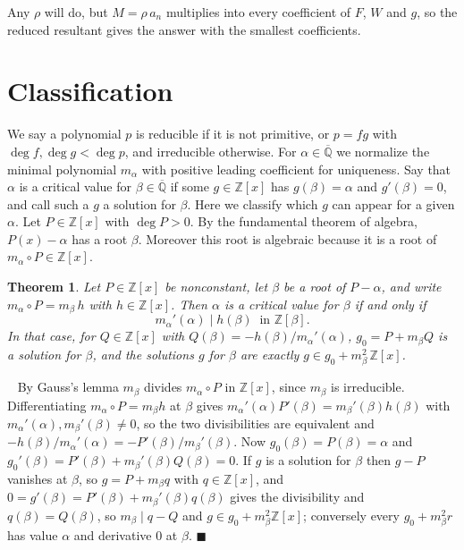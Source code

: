 \documentclass[10pt]{article}
\newcommand\Z{\mathbb{Z}}
\newcommand\Q{\mathbb{Q}}
\newcommand\1{\mathbb{1}}
\theoremstyle{plain}
\newtheorem{theorem}{Theorem}
\theoremstyle{remark}
\theoremstyle{plain}
\newenvironment{pf}{%
  \par\addvspace{\medskipamount}\noindent\uwave{pf.}\ \ignorespaces}{%
  \unskip\nobreak\hfill$\blacksquare$\par\addvspace{\medskipamount}}
\begin{document}
Any $\rho$ will do, but $M = \rho\,a_{n}$ multiplies into every coefficient of
$F$, $W$ and $g$, so the reduced resultant gives the answer with the smallest
coefficients.

\section{Classification}\label{Sclass}

We say a polynomial $p$ is reducible if it is not primitive, or $p = fg$
with $\deg f, \deg g < \deg p$, and irreducible otherwise. For
$\alpha \in \overline{\Q}$ we normalize the minimal polynomial $m_{\alpha}$
with positive leading coefficient for uniqueness.
Say that $\alpha$ is a critical value for $\beta \in \overline{\Q}$ if some
$g \in \Z[x]$ has $g(\beta) = \alpha$ and $g'(\beta) = 0$, and call such a $g$
a solution for $\beta$. Here we classify which $g$ can appear for a given
$\alpha$. Let $P \in \Z[x]$ with $\deg P > 0$. By the fundamental theorem
of algebra, $P(x) - \alpha$ has a root $\beta$. Moreover this root is
algebraic because it is a root of $m_{\alpha} \circ P \in \Z[x]$.

\begin{theorem}\label{Tcoset}
  Let $P \in \Z[x]$ be nonconstant, let $\beta$ be a root of $P - \alpha$,
  and write $m_{\alpha} \circ P = m_{\beta}\,h$ with $h \in \Z[x]$. Then
  $\alpha$ is a critical value for $\beta$ if and only if
  \[
    m_{\alpha}'(\alpha) \mid h(\beta) \ \text{ in } \Z[\beta] .
  \]
  In that case,
  for $Q \in \Z[x]$ with $Q(\beta) = -h(\beta)/m_{\alpha}'(\alpha)$,
  $g_{0} = P + m_{\beta}Q$ is a solution for $\beta$, and the solutions $g$
  for $\beta$ are exactly $g \in g_{0} + m_{\beta}^{2}\,\Z[x]$.
\end{theorem}

\begin{pf}
  By Gauss's lemma $m_{\beta}$ divides $m_{\alpha} \circ P$ in $\Z[x]$, since
  $m_{\beta}$ is irreducible. Differentiating $m_{\alpha} \circ P = m_{\beta}h$
  at $\beta$ gives $m_{\alpha}'(\alpha)P'(\beta) = m_{\beta}'(\beta)h(\beta)$
  with $m_{\alpha}'(\alpha), m_{\beta}'(\beta) \neq 0$, so the two
  divisibilities are equivalent and
  $-h(\beta)/m_{\alpha}'(\alpha) = -P'(\beta)/m_{\beta}'(\beta)$. Now
  $g_{0}(\beta) = P(\beta) = \alpha$ and
  $g_{0}'(\beta) = P'(\beta) + m_{\beta}'(\beta)Q(\beta) = 0$. If $g$ is a
  solution for $\beta$ then $g - P$ vanishes at $\beta$, so
  $g = P + m_{\beta}q$ with $q \in \Z[x]$, and
  $0 = g'(\beta) = P'(\beta) + m_{\beta}'(\beta)q(\beta)$ gives the
  divisibility and $q(\beta) = Q(\beta)$, so $m_{\beta} \mid q - Q$ and
  $g \in g_{0} + m_{\beta}^{2}\Z[x]$; conversely every $g_{0} + m_{\beta}^{2}r$
  has value $\alpha$ and derivative $0$ at $\beta$.
\end{pf}
\end{document}
